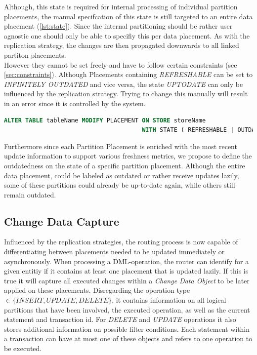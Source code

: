 Although, this state is required for internal processing of individual partition placements, the manual specifcation of this state is still 
targeted to an entire data placement (\ref{lst:state}).
Since the internal partitioning should be rather user agnostic one should only be able to specifiy this per data placement. 
As with the replication strategy, the changes are then propagated downwards to all linked partiton placements.\\

However they cannot be set freely and have to follow certain constraints (see \ref{sec:constraints}).
Although Placements containing \emph{REFRESHABLE} can be set to \emph{INFINITELY OUTDATED} and vice versa, the state \emph{UPTODATE} can only be influenced by the replication strategy.
Trying to change this manually will result in an error since it is controlled by the system.

\begin{lstlisting}[language=sql, caption={SQL Statement Syntax to change the designated Replication State of data placement.},label={lst:state}]
ALTER TABLE tableName MODIFY PLACEMENT ON STORE storeName 
                                       WITH STATE ( REFRESHABLE | OUTDATED );
\end{lstlisting}

Furthermore since each Partition Placement is enriched with the most recent update information to support various freshness metrics,
we propose to define the outdatedness on the state of a specific partition placement.
Although the entire data placement, could be labeled as outdated or rather receive updates lazily, some of 
these partitions could already be up-to-date again, while others still remain outdated.



\subsection{Change Data Capture}
\label{sec:cdc_impl}

Influenced by the replication strategies, the routing process is now capable of differentiating between placements needed to be updated immediately or asynchronously. 
When processing a DML-operation, the router can identify for a given entitiy if it contains at least one placement that is updated lazily.
If this is true it will capture all executed changes within a \emph{Change Data Object} to be later applied on these placements. 
Disregarding the operation type $\in \{INSERT,UPDATE,DELETE\}$, it contains information on all logical partitions that have been involved, 
the executed operation, as well as the current statement and transaction id. For \emph{DELETE} and \emph{UPDATE} operations it also stores additional information on possible filter 
conditions. Each statement within a transaction can have at most one of these objects and refers to one operation to be executed.\\

